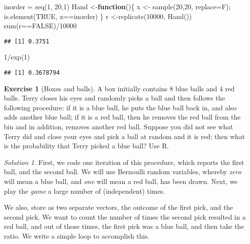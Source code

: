 \documentclass[
]{article}
\newenvironment{Shaded}{\begin{snugshade}}{\end{snugshade}}
\newcommand{\AttributeTok}[1]{\textcolor[rgb]{0.77,0.63,0.00}{#1}}
\newcommand{\ConstantTok}[1]{\textcolor[rgb]{0.00,0.00,0.00}{#1}}
\newcommand{\ControlFlowTok}[1]{\textcolor[rgb]{0.13,0.29,0.53}{\textbf{#1}}}
\newcommand{\DecValTok}[1]{\textcolor[rgb]{0.00,0.00,0.81}{#1}}
\newcommand{\FunctionTok}[1]{\textcolor[rgb]{0.00,0.00,0.00}{#1}}
\newcommand{\NormalTok}[1]{#1}
\newcommand{\OtherTok}[1]{\textcolor[rgb]{0.56,0.35,0.01}{#1}}
\newcommand{\SpecialCharTok}[1]{\textcolor[rgb]{0.00,0.00,0.00}{#1}}
\theoremstyle{definition}
\theoremstyle{definition}
\theoremstyle{definition}
\newtheorem{exercise}{Exercise}[section]
\theoremstyle{remark}
\newtheorem*{solution}{Solution}
\begin{document}
\begin{Shaded}
\begin{Highlighting}[]
\NormalTok{inorder }\OtherTok{=} \FunctionTok{seq}\NormalTok{(}\DecValTok{1}\NormalTok{, }\DecValTok{20}\NormalTok{,}\DecValTok{1}\NormalTok{)}
\NormalTok{Hand }\OtherTok{\textless{}{-}}\ControlFlowTok{function}\NormalTok{()\{}
\NormalTok{x }\OtherTok{\textless{}{-}} \FunctionTok{sample}\NormalTok{(}\DecValTok{20}\NormalTok{,}\DecValTok{20}\NormalTok{, }\AttributeTok{replace=}\NormalTok{F);}
\FunctionTok{is.element}\NormalTok{(}\ConstantTok{TRUE}\NormalTok{, x}\SpecialCharTok{==}\NormalTok{inorder)}
\NormalTok{\}}
\NormalTok{r }\OtherTok{\textless{}{-}}\FunctionTok{replicate}\NormalTok{(}\DecValTok{10000}\NormalTok{, }\FunctionTok{Hand}\NormalTok{())}
\FunctionTok{sum}\NormalTok{(r}\SpecialCharTok{==}\ConstantTok{FALSE}\NormalTok{)}\SpecialCharTok{/}\DecValTok{10000}
\end{Highlighting}
\end{Shaded}

\begin{verbatim}
## [1] 0.3751
\end{verbatim}

\begin{Shaded}
\begin{Highlighting}[]
\DecValTok{1}\SpecialCharTok{/}\FunctionTok{exp}\NormalTok{(}\DecValTok{1}\NormalTok{)}
\end{Highlighting}
\end{Shaded}

\begin{verbatim}
## [1] 0.3678794
\end{verbatim}

\begin{exercise}[Boxes and balls]
\protect\hypertarget{exr:unnamed-chunk-12}{}{\label{exr:unnamed-chunk-12} \iffalse (Boxes and balls) \fi{} } A box initially contains \(8\) blue balls and \(4\) red balls. Terry closes his eyes and randomly picks a ball and then follows the following procedure: if it is a blue ball, he puts the blue ball back in, and also adds another blue ball; if it is a red ball, then he removes the red ball from the bin and in addition, removes another red ball. Suppose you did not see what Terry did and close your eyes and pick a ball at random and it is red; then what is the probability that Terry picked a blue ball? Use R.\\
\end{exercise}
\begin{solution}
\iffalse{} {Solution. } \fi{}First, we code one iteration of this procedure, which reports the first ball, and the second ball. We will use Bernoulli random variables, whereby \emph{zero} will mean a blue ball, and \emph{one} will mean a red ball, has been drawn.
Next, we play the \emph{game} a large number of (independent) times.

We also, store as two separate vectors, the outcome of the first pick, and the second pick. We want to count the number of times the second pick resulted in a red ball, and out of those times, the first pick was a blue ball, and then take the ratio. We write a simple loop to accomplish this.
\end{solution}
\end{document}
